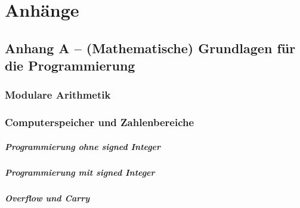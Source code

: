 \chapter{Anhänge}
\section{Anhang A – (Mathematische) Grundlagen für die Programmierung}
\subsection{Modulare Arithmetik}
\subsection{Computerspeicher und Zahlenbereiche}
\paragraph{Programmierung ohne signed Integer}
\paragraph{Programmierung mit signed Integer}
\paragraph{Overflow und Carry}
